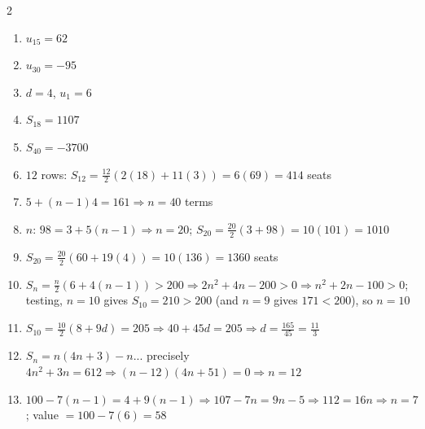 \documentclass[11pt]{article}
\begin{document}
\begin{keybox}
\begin{multicols}{2}
\small
\begin{enumerate}[leftmargin=*,itemsep=3pt]
  \item $u_{15}=62$
  \item $u_{30}=-95$
  \item $d=4$, $u_1=6$
  \item $S_{18}=1107$
  \item $S_{40}=-3700$
  \item $12$ rows: $S_{12}=\tfrac{12}{2}(2(18)+11(3))=6(69)=414$ seats
  \item $5+(n-1)4=161\Rightarrow n=40$ terms
  \item $n$: $98=3+5(n-1)\Rightarrow n=20$; $S_{20}=\tfrac{20}2(3+98)=10(101)=1010$
  \item $S_{20}=\tfrac{20}2(60+19(4))=10(136)=1360$ seats
  \item $S_n=\tfrac n2(6+4(n-1))>200\Rightarrow 2n^2+4n-200>0\Rightarrow n^2+2n-100>0$; testing, $n=10$ gives $S_{10}=210>200$ (and $n=9$ gives $171<200$), so $n=10$
  \item $S_{10}=\tfrac{10}{2}(8+9d)=205\Rightarrow 40+45d=205\Rightarrow d=\tfrac{165}{45}=\tfrac{11}{3}$
  \item $S_n=n(4n+3)-n... $ precisely $4n^2+3n=612\Rightarrow(n-12)(4n+51)=0\Rightarrow n=12$
  \item $100-7(n-1)=4+9(n-1)\Rightarrow107-7n=9n-5\Rightarrow112=16n\Rightarrow n=7$; value $=100-7(6)=58$
\end{enumerate}
\end{multicols}
\end{keybox}
\end{document}
